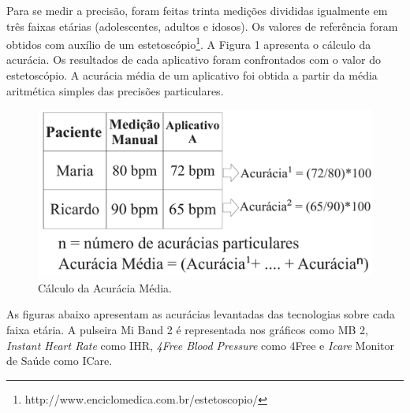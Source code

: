 \documentclass[12pt]{article}
\begin{document}
Para se medir a precisão, foram feitas trinta medições divididas igualmente em três faixas etárias (adolescentes, adultos e idosos). Os valores de referência foram obtidos com auxílio de um estetoscópio\footnote{http://www.enciclomedica.com.br/estetoscopio/}. A Figura 1 apresenta o cálculo da acurácia. Os resultados de cada aplicativo foram confrontados com o valor do estetoscópio. A acurácia média de um aplicativo foi obtida a partir da média aritmética simples das precisões particulares.

\begin{figure}[H]
\centering
\includegraphics[width=.34\linewidth, frame]{explanation}
\caption{Cálculo da Acurácia Média.}
\label{fig:exampleFig1}
\end{figure}

As figuras abaixo apresentam as acurácias levantadas das tecnologias sobre cada faixa etária. A pulseira Mi Band 2 é representada nos gráficos como MB 2, \textit{Instant Heart Rate} como IHR, \textit{4Free Blood Pressure} como 4Free e \textit{Icare} Monitor de Saúde como ICare.
\end{document}
